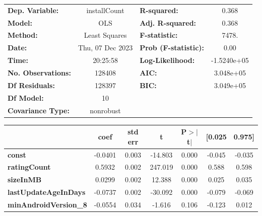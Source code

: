 \begin{center}
\begin{table}
\begin{tabular}{lclc}
\toprule
\textbf{Dep. Variable:}    &   installCount   & \textbf{  R-squared:         } &      0.368   \\
\textbf{Model:}            &       OLS        & \textbf{  Adj. R-squared:    } &      0.368   \\
\textbf{Method:}           &  Least Squares   & \textbf{  F-statistic:       } &      7478.   \\
\textbf{Date:}             & Thu, 07 Dec 2023 & \textbf{  Prob (F-statistic):} &      0.00    \\
\textbf{Time:}             &     20:25:58     & \textbf{  Log-Likelihood:    } & -1.5240e+05  \\
\textbf{No. Observations:} &      128408      & \textbf{  AIC:               } &  3.048e+05   \\
\textbf{Df Residuals:}     &      128397      & \textbf{  BIC:               } &  3.049e+05   \\
\textbf{Df Model:}         &          10      & \textbf{                     } &              \\
\textbf{Covariance Type:}  &    nonrobust     & \textbf{                     } &              \\
\bottomrule
\end{tabular}
\begin{tabular}{lcccccc}
\toprule
                                & \textbf{coef} & \textbf{std err} & \textbf{t} & \textbf{P$> |$t$|$} & \textbf{[0.025} & \textbf{0.975]}  \\
\midrule
\textbf{const}                  &      -0.0401  &        0.003     &   -14.803  &         0.000        &       -0.045    &       -0.035     \\
\textbf{ratingCount}            &       0.5932  &        0.002     &   247.019  &         0.000        &        0.588    &        0.598     \\
\textbf{sizeInMB}               &       0.0299  &        0.002     &    12.388  &         0.000        &        0.025    &        0.035     \\
\textbf{lastUpdateAgeInDays}    &      -0.0737  &        0.002     &   -30.092  &         0.000        &       -0.079    &       -0.069     \\
\textbf{minAndroidVersion\_8}   &      -0.0554  &        0.034     &    -1.616  &         0.106        &       -0.123    &        0.012     \\

\end{tabular}
\end{table}
\end{center}
